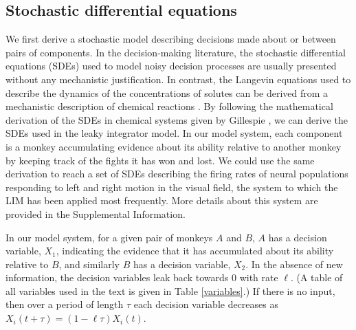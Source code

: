 \documentclass{pnastwo}
\begin{document}
\begin{article}
\subsection{Stochastic differential equations}    
We first derive a stochastic model describing decisions made about or between pairs of components. In the decision-making literature, the stochastic differential equations (SDEs) used to model noisy decision processes are usually presented without any mechanistic justification. In contrast, the Langevin equations used to describe the dynamics of the concentrations of solutes can be derived from a mechanistic description of chemical reactions \cite{Gillespie:2000fk}. By following the mathematical derivation of the SDEs in chemical systems given by Gillespie \cite{Gillespie:2000fk},  we can derive the SDEs used in the leaky integrator model.  In our model system, each component is a monkey accumulating evidence about its ability relative to another monkey by keeping track of the fights it has won and lost. We could use the same derivation to reach a set of SDEs describing the firing rates of neural populations responding to left and right motion in the visual field, the system to which the LIM has been applied most frequently. More details about this system are provided in the Supplemental Information. 

In our model system, for a given pair of monkeys $A$ and $B$, $A$ has a decision variable, $X_1$, indicating the evidence that it has accumulated about its ability relative to $B$, and similarly $B$ has a decision variable, $X_2$. In the absence of new information, the decision variables leak back towards $0$ with rate $\ell$.  (A table of all variables used in the text is given in Table \ref{variables}.)  If there is no input, then over a period of length $\tau$ each decision variable decreases as $X_i(t+\tau)=(1-\ell\tau)X_i(t)$. 


\end{article}
\end{document}
